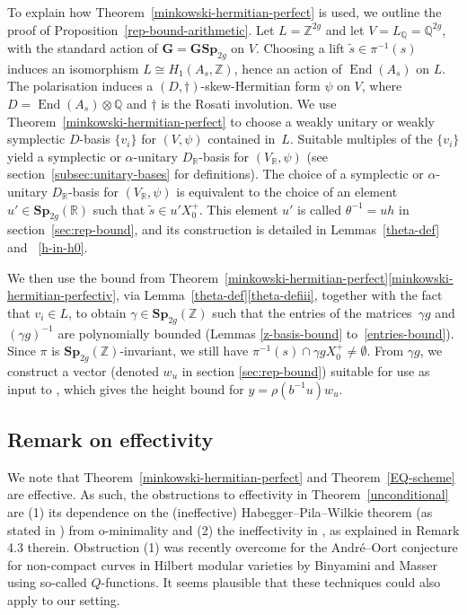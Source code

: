 \documentclass[11pt]{article}
\numberwithin{equation}{section}
\newcommand{\bQ}{\mathbb{Q}}
\newcommand{\bR}{\mathbb{R}}
\newcommand{\bZ}{\mathbb{Z}}
\newcommand{\gG}{\mathbf{G}}
\newcommand{\gGSp}{\mathbf{GSp}}
\newcommand{\gSp}{\mathbf{Sp}}
\DeclareMathOperator{\End}{End}
\begin{document}
To explain how Theorem~\ref{minkowski-hermitian-perfect} is used, we outline the proof of Proposition~\ref{rep-bound-arithmetic}. Let $L = \bZ^{2g}$ and let $V = L_\bQ = \bQ^{2g}$, with the standard action of $\gG=\gGSp_{2g}$ on $V$. Choosing a lift $\tilde s \in \pi^{-1}(s)$ induces an isomorphism $L \cong H_1(A_s, \bZ)$, hence an action of $\End(A_s)$ on $L$. The polarisation induces a $(D,\dag)$-skew-Hermitian form $\psi$ on $V$, where $D = \End(A_s) \otimes \bQ$ and $\dag$ is the Rosati involution.
We use Theorem~\ref{minkowski-hermitian-perfect} to choose a weakly unitary or weakly symplectic $D$-basis $\{v_i\}$ for $(V, \psi)$ contained in~$L$.
Suitable multiples of the $\{v_i\}$ yield a symplectic or $\alpha$-unitary $D_\bR$-basis for $(V_\bR, \psi)$ (see section~\ref{subsec:unitary-bases} for definitions).
The choice of a symplectic or $\alpha$-unitary $D_\bR$-basis for $(V_\bR, \psi)$ is equivalent to the choice of an element $u' \in \gSp_{2g}(\bR)$ such that $\tilde s \in u'X_0^+$.
This element $u'$ is called $\theta^{-1}=uh$ in section~\ref{sec:rep-bound}, and its construction is detailed in Lemmas~\ref{theta-def} and~ \ref{h-in-h0}.

We then use the bound from Theorem~\ref{minkowski-hermitian-perfect}\eqref{minkowski-hermitian-perfectiv}, via Lemma~\ref{theta-def}\eqref{theta-defiii}, together with the fact that $v_i \in L$, to obtain $\gamma \in \gSp_{2g}(\bZ)$ such that the entries of the matrices~$\gamma g$ and $(\gamma g)^{-1}$ are polynomially bounded (Lemmas \ref{z-basis-bound} to~\ref{entries-bound}).
Since $\pi$ is $\gSp_{2g}(\bZ)$-invariant, we still have $\pi^{-1}(s) \cap \gamma gX_0^+ \neq \emptyset$.
From $\gamma g$, we construct a vector (denoted $w_u$ in section \ref{sec:rep-bound}) suitable for use as input to \cite[Th.\,1.2]{QRTUI}, which gives the height bound for $y = \rho(b^{-1}u)w_u$.

\subsection{Remark on effectivity}

We note that Theorem~\ref{minkowski-hermitian-perfect} and Theorem~\ref{EQ-scheme} are effective. As such, the obstructions to effectivity in Theorem~\ref{unconditional} are (1) its dependence on the (ineffective) Habegger--Pila--Wilkie theorem (as stated in \cite[Th.\,9.1]{DR18}) from o-minimality and (2) the ineffectivity in \cite{QRTUI}, as explained in Remark 4.3 therein. Obstruction (1) was recently overcome for the André--Oort conjecture for non-compact curves in Hilbert modular varieties by Binyamini and Masser \cite{BM:AO} using so-called $Q$-functions. It seems plausible that these techniques could also apply to our setting.
\end{document}
